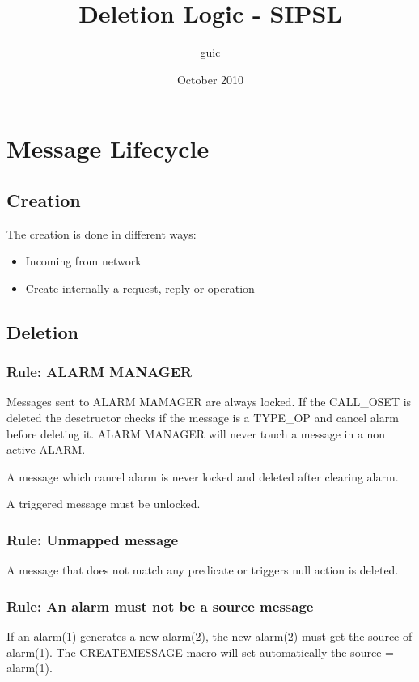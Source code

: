 \documentclass[a4paper]{article}
\title{Deletion Logic - SIPSL}
\author{guic}
\date{October 2010}
\begin{document}
	\small
	\maketitle
\section{Message Lifecycle}

\subsection{Creation}

The creation is done in different ways:

\begin{itemize}
   \item Incoming from network
   \item Create internally a request, reply or operation
\end{itemize}

\subsection{Deletion}

\subsubsection{Rule: ALARM MANAGER}
 Messages sent to ALARM MAMAGER are always locked. If the CALL\_OSET is deleted the desctructor checks if the message is a TYPE\_OP and cancel alarm before deleting it.
 ALARM MANAGER will never touch a message in a non active ALARM.
 
 A message which cancel alarm is never locked and deleted after clearing alarm.
 
 A triggered message must be unlocked.
 
\subsubsection{Rule: Unmapped message}
 
A message that does not match any predicate or triggers null action is deleted.
 
\subsubsection{Rule: An alarm must not be a source message}
If an alarm(1) generates a new alarm(2), the new alarm(2) must get the source of alarm(1).
The CREATEMESSAGE macro will set automatically the source = alarm(1).
 
\end{document}
